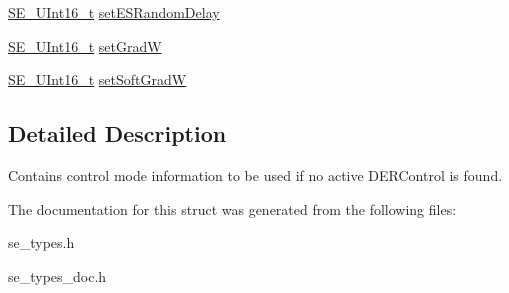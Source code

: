 \begin{DoxyCompactItemize}
\item 
\hyperlink{group__UInt16_gac68d541f189538bfd30cfaa712d20d29}{S\+E\+\_\+\+U\+Int16\+\_\+t} \hyperlink{group__DefaultDERControl_gad9d93853acbfe271a02fe438eff09313}{set\+E\+S\+Random\+Delay}
\item 
\hyperlink{group__UInt16_gac68d541f189538bfd30cfaa712d20d29}{S\+E\+\_\+\+U\+Int16\+\_\+t} \hyperlink{group__DefaultDERControl_ga89a34e3b5eeda3880b30f0c4136257ad}{set\+GradW}
\item 
\hyperlink{group__UInt16_gac68d541f189538bfd30cfaa712d20d29}{S\+E\+\_\+\+U\+Int16\+\_\+t} \hyperlink{group__DefaultDERControl_gae2bf2188e38848f18c748c1b540d3429}{set\+Soft\+GradW}
\end{DoxyCompactItemize}


\subsection{Detailed Description}
Contains control mode information to be used if no active D\+E\+R\+Control is found. 

The documentation for this struct was generated from the following files\+:\begin{DoxyCompactItemize}
\item 
se\+\_\+types.\+h\item 
se\+\_\+types\+\_\+doc.\+h\end{DoxyCompactItemize}
